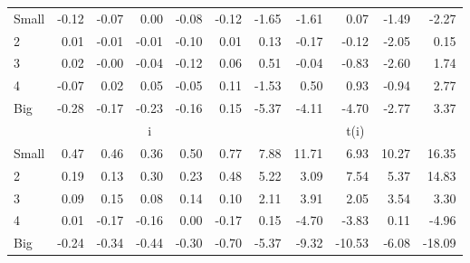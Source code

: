 \begin{table}[!ht]
\begin{tabular}{lrrrrrrrrrr}
    \\
      \cmidrule(r){2-6} \cmidrule(r){7-11}

    Small   & -0.12  & -0.07  & 0.00  & -0.08  & -0.12  & -1.65  & -1.61  & 0.07  & -1.49  & -2.27  \\
         2  & 0.01  & -0.01  & -0.01  & -0.10  & 0.01  & 0.13  & -0.17  & -0.12  & -2.05  & 0.15  \\
         3  & 0.02  & -0.00  & -0.04  & -0.12  & 0.06  & 0.51  & -0.04  & -0.83  & -2.60  & 1.74  \\
         4  & -0.07  & 0.02  & 0.05  & -0.05  & 0.11  & -1.53  & 0.50  & 0.93  & -0.94  & 2.77  \\
    Big     & -0.28  & -0.17  & -0.23  & -0.16  & 0.15  & -5.37  & -4.11  & -4.70  & -2.77  & 3.37  \\

  
    
      & \multicolumn{5}{c}{i} & \multicolumn{5}{c}{t(i)}
    
    \\
      \cmidrule(r){2-6} \cmidrule(r){7-11}

    Small   & 0.47  & 0.46  & 0.36  & 0.50  & 0.77  & 7.88  & 11.71  & 6.93  & 10.27  & 16.35  \\
         2  & 0.19  & 0.13  & 0.30  & 0.23  & 0.48  & 5.22  & 3.09  & 7.54  & 5.37  & 14.83  \\
         3  & 0.09  & 0.15  & 0.08  & 0.14  & 0.10  & 2.11  & 3.91  & 2.05  & 3.54  & 3.30  \\
         4  & 0.01  & -0.17  & -0.16  & 0.00  & -0.17  & 0.15  & -4.70  & -3.83  & 0.11  & -4.96  \\
    Big     & -0.24  & -0.34  & -0.44  & -0.30  & -0.70  & -5.37  & -9.32  & -10.53  & -6.08  & -18.09  \\

  

  \bottomrule
\end{tabular}
\label{tbl:25_Size_Inv_FF2016}
\end{table}